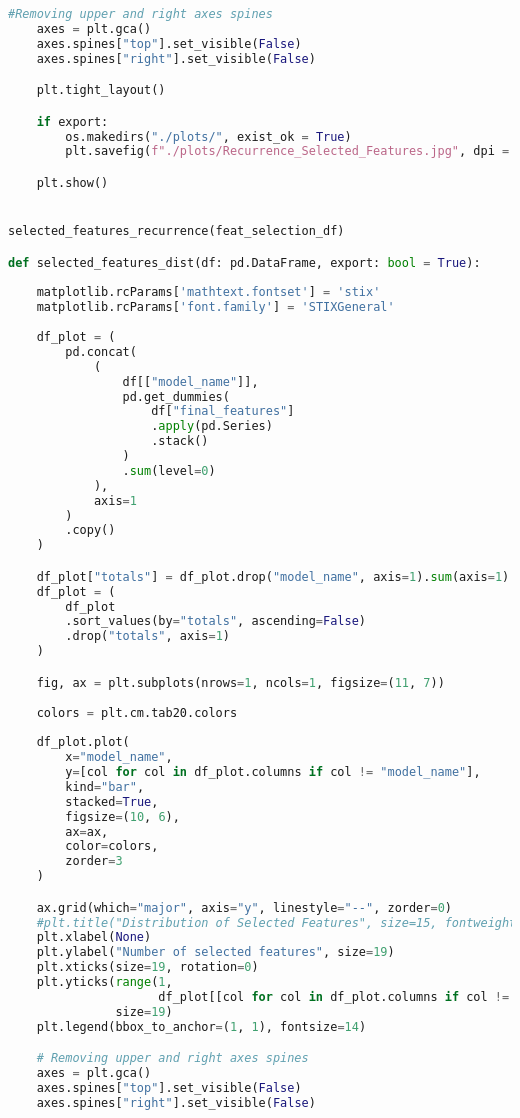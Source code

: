 \begin{lstlisting}[language=Python, basicstyle=\footnotesize\ttfamily]
        #Removing upper and right axes spines
    axes = plt.gca()
    axes.spines["top"].set_visible(False)
    axes.spines["right"].set_visible(False)

    plt.tight_layout()

    if export:
        os.makedirs("./plots/", exist_ok = True)
        plt.savefig(f"./plots/Recurrence_Selected_Features.jpg", dpi = 300)

    plt.show()


selected_features_recurrence(feat_selection_df)

def selected_features_dist(df: pd.DataFrame, export: bool = True):
    
    matplotlib.rcParams['mathtext.fontset'] = 'stix'
    matplotlib.rcParams['font.family'] = 'STIXGeneral'
    
    df_plot = (
        pd.concat(
            (
                df[["model_name"]],
                pd.get_dummies(
                    df["final_features"]
                    .apply(pd.Series)
                    .stack()
                )
                .sum(level=0)
            ),
            axis=1
        )
        .copy()
    )

    df_plot["totals"] = df_plot.drop("model_name", axis=1).sum(axis=1)
    df_plot = (
        df_plot
        .sort_values(by="totals", ascending=False)
        .drop("totals", axis=1)
    )

    fig, ax = plt.subplots(nrows=1, ncols=1, figsize=(11, 7))
    
    colors = plt.cm.tab20.colors
    
    df_plot.plot(
        x="model_name",
        y=[col for col in df_plot.columns if col != "model_name"],
        kind="bar",
        stacked=True,
        figsize=(10, 6),
        ax=ax,
        color=colors,
        zorder=3
    )

    ax.grid(which="major", axis="y", linestyle="--", zorder=0)
    #plt.title("Distribution of Selected Features", size=15, fontweight="bold")
    plt.xlabel(None)
    plt.ylabel("Number of selected features", size=19)
    plt.xticks(size=19, rotation=0)
    plt.yticks(range(1,
                     df_plot[[col for col in df_plot.columns if col != "model_name"]].sum(axis=1).max() + 1),
               size=19)
    plt.legend(bbox_to_anchor=(1, 1), fontsize=14)

    # Removing upper and right axes spines
    axes = plt.gca()
    axes.spines["top"].set_visible(False)
    axes.spines["right"].set_visible(False)


\end{lstlisting}
